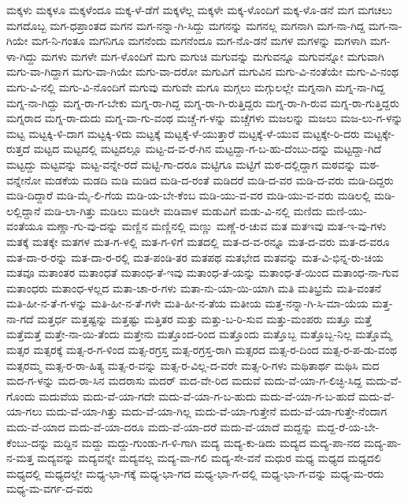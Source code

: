 {ಮಕ್ಕಳು
ಮಕ್ಕಳೂ
ಮಕ್ಕಳೆಂದೂ
ಮಕ್ಕ-ಳೆ-ಡೆಗೆ
ಮಕ್ಕಳೆಲ್ಲ
ಮಕ್ಕಳೇ
ಮಕ್ಕ-ಳೊಂದಿಗೆ
ಮಕ್ಕ-ಳೊ-ಡನೆ
ಮಗ
ಮಗಚಲು
ಮಗದೊಬ್ಬ
ಮಗ-ಧಪ್ರಾಂತದ
ಮಗನ
ಮಗ-ನನ್ನಾ-ಗಿ-ಸಿದ್ದು
ಮಗನನ್ನು
ಮಗನಲ್ಲ
ಮಗನಾಗಿ
ಮಗ-ನಾ-ಗಿದ್ದ
ಮಗ-ನಾ-ಗಿಯೇ
ಮಗ-ನಿ-ಗಂತೂ
ಮಗನಿಗೂ
ಮಗನೆಂದು
ಮಗನೆಂದೂ
ಮಗ-ನೊ-ಡನೆ
ಮಗಳ
ಮಗಳನ್ನು
ಮಗಳಾಗಿ
ಮಗ-ಳಾ-ಗಿದ್ದು
ಮಗಳು
ಮಗಳೇ
ಮಗ-ಳೊಂದಿಗೆ
ಮಗು
ಮಗುಚಿ
ಮಗುವನ್ನು
ಮಗುವನ್ನೂ
ಮಗುವನ್ನೋ
ಮಗುವಾಗಿ
ಮಗು-ವಾ-ಗಿದ್ದಾಗ
ಮಗು-ವಾ-ಗಿಯೇ
ಮಗು-ವಾ-ದರೋ
ಮಗುವಿಗೆ
ಮಗುವಿನ
ಮಗು-ವಿ-ನಂತೆಯೇ
ಮಗು-ವಿ-ನಂಥ
ಮಗು-ವಿ-ನಲ್ಲಿ
ಮಗು-ವಿ-ನೊಂದಿಗೆ
ಮಗುವು
ಮಗುವೇ
ಮಗೂ
ಮಗ್ಗಲು
ಮಗ್ಗುಲಲ್ಲೇ
ಮಗ್ನನಾಗಿ
ಮಗ್ನ-ನಾ-ಗಿದ್ದ
ಮಗ್ನ-ನಾ-ಗಿದ್ದು
ಮಗ್ನ-ರಾ-ಗ-ಬೇಕು
ಮಗ್ನ-ರಾ-ಗಿದ್ದ
ಮಗ್ನ-ರಾ-ಗಿ-ರುತ್ತಿದ್ದರು
ಮಗ್ನ-ರಾ-ಗಿ-ರುವ
ಮಗ್ನ-ರಾ-ಗುತ್ತಿದ್ದರು
ಮಗ್ನರಾದ
ಮಗ್ನ-ರಾ-ದುದು
ಮಗ್ನ-ವಾ-ಗು-ವಂಥ
ಮಚ್ಚೆ-ಗ-ಳನ್ನು
ಮಚ್ಚೆಗಳು
ಮಜಲನ್ನು
ಮಜಲು
ಮಜ-ಲು-ಗ-ಳನ್ನು
ಮಟ್ಟ
ಮಟ್ಟಕ್ಕಿ-ಳಿ-ದಾಗ
ಮಟ್ಟಕ್ಕಿ-ಳಿದು
ಮಟ್ಟಕ್ಕೆ
ಮಟ್ಟಕ್ಕೆ-ಳೆ-ಯುತ್ತಾರೆ
ಮಟ್ಟಕ್ಕೆ-ಳೆ-ಯುವ
ಮಟ್ಟಕ್ಕೇ-ರಿ-ದರು
ಮಟ್ಟಕ್ಕೇ-ರುತ್ತದೆ
ಮಟ್ಟದ
ಮಟ್ಟದಲ್ಲಿ
ಮಟ್ಟದಲ್ಲೂ
ಮಟ್ಟ-ದ-ವ-ರೆ-ಗಿನ
ಮಟ್ಟದ್ದಾ-ಗ-ಬ-ಹು-ದೆಂಬು-ದನ್ನು
ಮಟ್ಟದ್ದಾ-ಗಿದೆ
ಮಟ್ಟದ್ದು
ಮಟ್ಟವನ್ನು
ಮಟ್ಟ-ವನ್ನೇ-ರದೆ
ಮಟ್ಟಿ-ಗಾ-ದರೂ
ಮಟ್ಟಿಗೂ
ಮಟ್ಟಿಗೆ
ಮಠ-ದಲ್ಲಿದ್ದಾಗ
ಮಠವನ್ನು
ಮಠ-ವನ್ನೇನೋ
ಮಡಕೆಯ
ಮಡದಿ
ಮಡಿ
ಮಡಿದ
ಮಡಿ-ದ-ರಂತೆ
ಮಡಿದರೆ
ಮಡಿ-ದ-ವರ
ಮಡಿ-ದ-ವರು
ಮಡಿ-ದಿದ್ದರು
ಮಡಿ-ದಿದ್ದಾರೆ
ಮಡಿ-ಮೈ-ಲಿ-ಗೆಯ
ಮಡಿ-ಯ-ಬೇ-ಕೆಂಬ
ಮಡಿ-ಯು-ವ-ವರ
ಮಡಿ-ಯು-ವ-ವರು
ಮಡಿಲಲ್ಲಿ
ಮಡಿ-ಲಲ್ಲಿದ್ದಾನೆ
ಮಡಿ-ಲಾ-ಗಿತ್ತು
ಮಡಿಲು
ಮಡಿಲೇ
ಮಡಿವಾಳ
ಮಡುವಿಗೆ
ಮಡು-ವಿ-ನಲ್ಲಿ
ಮಣಿದು
ಮಣಿ-ಯು-ವಂತೆಯೂ
ಮಣ್ಣಾ-ಗು-ವು-ದನ್ನು
ಮಣ್ಣಿನ
ಮಣ್ಣಿನಲ್ಲಿ
ಮಣ್ಣು
ಮಣ್ಣೆ-ರ-ಚುವ
ಮತ
ಮತಇವು
ಮತ-ಇ-ವು-ಗಳು
ಮತಕ್ಕೆ
ಮತಕ್ಕೇ
ಮತಗಳ
ಮತ-ಗ-ಳಲ್ಲಿ
ಮತ-ಗ-ಳಿಗೆ
ಮತದಲ್ಲಿ
ಮತ-ದ-ವ-ರನ್ನೂ
ಮತ-ದ-ವರು
ಮತ-ದ-ವರೂ
ಮತ-ದಾ-ರ-ರನ್ನು
ಮತ-ದಾ-ರ-ರಲ್ಲಿ
ಮತ-ಪಂಡಿ-ತರ
ಮತಪಥ
ಮತಭೇದ
ಮತವನ್ನು
ಮತ-ವಿ-ಭಿನ್ನ-ರು-ಚಿಯ
ಮತವೂ
ಮತಾಂತರ
ಮತಾಂಧತೆ
ಮತಾಂಧ-ತೆ-ಇವು
ಮತಾಂಧ-ತೆ-ಯನ್ನು
ಮತಾಂಧ-ತೆ-ಯಿಂದ
ಮತಾಂಧ-ನಾ-ಗುವ
ಮತಾಂಧರು
ಮತಾಂಧ-ಳಲ್ಲದ
ಮತಾ-ಚಾ-ರ-ಗಳು
ಮತಾ-ನು-ಯಾ-ಯಿ-ಯಾಗಿ
ಮತಿ
ಮತಿಭ್ರಮೆ
ಮತಿ-ವಂತನೆ
ಮತಿ-ಹೀ-ನ-ತೆ-ಗ-ಳನ್ನು
ಮತಿ-ಹೀ-ನ-ತೆ-ಗಳೇ
ಮತಿ-ಹೀ-ನ-ತೆಯ
ಮತೀಯ
ಮತ್ತ-ನನ್ನಾ-ಗಿ-ಸಿ-ಮಾ-ಯೆಯ
ಮತ್ತ-ನಾ-ಗದೆ
ಮತ್ತರ್ಧ
ಮತ್ತಷ್ಟನ್ನು
ಮತ್ತಷ್ಟು
ಮತ್ತಿತರ
ಮತ್ತು
ಮತ್ತು-ಬ-ರಿ-ಸುವ
ಮತ್ತು-ಮಂಪರು
ಮತ್ತೂ
ಮತ್ತೆ
ಮತ್ತೆಮತ್ತೆ
ಮತ್ತೇ-ನಾ-ಯಿ-ತೆಂದು
ಮತ್ತೇನು
ಮತ್ತೊಂದ-ರಿಂದ
ಮತ್ತೊಂದು
ಮತ್ತೊಬ್ಬ
ಮತ್ತೊಬ್ಬ-ನಿಲ್ಲ
ಮತ್ತೊಮ್ಮೆ
ಮತ್ಸರ
ಮತ್ಸರಕ್ಕೆ
ಮತ್ಸ-ರ-ಗ-ಳಿಂದ
ಮತ್ಸ-ರಗ್ರಸ್ತ
ಮತ್ಸ-ರಗ್ರಸ್ತ-ರಾಗಿ
ಮತ್ಸರದ
ಮತ್ಸ-ರ-ದಿಂದ
ಮತ್ಸ-ರ-ಪ-ಡು-ವಂಥ
ಮತ್ಸರಮ್ಮ
ಮತ್ಸ-ರ-ರಾ-ಹಿತ್ಯ
ಮತ್ಸ-ರ-ವನ್ನು
ಮತ್ಸ-ರ-ವಿಲ್ಲ-ದ-ವರೇ
ಮತ್ಸ-ರಿ-ಗಳು
ಮಥಿತಾರ್ಥ
ಮಥಿಸಿ
ಮದ
ಮದ-ಗ-ಳನ್ನು
ಮದ-ರಾ-ಸಿನ
ಮದರಾಸು
ಮದರ್
ಮದ-ವೇ-ರಿದ
ಮದುವೆ
ಮದು-ವೆ-ಯಾ-ಗ-ಲಿಚ್ಛಿ-ಸಿದ್ದ
ಮದು-ವೆ-ಗೊಂದು
ಮದುವೆಯ
ಮದು-ವೆ-ಯಾ-ಗದೇ
ಮದು-ವೆ-ಯಾ-ಗ-ಬ-ಹುದು
ಮದು-ವೆ-ಯಾ-ಗ-ಬ-ಹುದೆ
ಮದು-ವೆ-ಯಾ-ಗಲು
ಮದು-ವೆ-ಯಾ-ಗಿತ್ತು
ಮದು-ವೆ-ಯಾ-ಗಿಲ್ಲ
ಮದು-ವೆ-ಯಾ-ಗುತ್ತೇನೆ
ಮದು-ವೆ-ಯಾ-ಗುತ್ತೇ-ನೆಂದಾಗ
ಮದು-ವೆ-ಯಾದ
ಮದು-ವೆ-ಯಾ-ದರೂ
ಮದು-ವೆ-ಯಾ-ದರೆ
ಮದು-ವೆ-ಯಾದೆ
ಮದ್ದನ್ನು
ಮದ್ದ-ರೆ-ಯ-ಬೇ-ಕೆಂಬು-ದನ್ನು
ಮದ್ದಿನ
ಮದ್ದು
ಮದ್ದು-ಗುಂಡು-ಗ-ಳಿ-ಗಾಗಿ
ಮದ್ಯ
ಮದ್ಯ-ಕು-ಡಿದು
ಮದ್ಯದ
ಮದ್ಯ-ಪಾ-ನದ
ಮದ್ಯ-ಪಾ-ನ-ಮತ್ತ
ಮದ್ಯವನ್ನು
ಮದ್ಯವನ್ನೇ
ಮದ್ಯವಲ್ಲ
ಮದ್ಯ-ವಾ-ಗಲಿ
ಮದ್ಯ-ಸೇ-ವನೆ
ಮಧುರ
ಮಧ್ಯ
ಮಧ್ಯದ
ಮಧ್ಯದಲಿ
ಮಧ್ಯದಲ್ಲಿ
ಮಧ್ಯದಲ್ಲೇ
ಮಧ್ಯ-ಭಾ-ಗಕ್ಕೆ
ಮಧ್ಯ-ಭಾ-ಗದ
ಮಧ್ಯ-ಭಾ-ಗ-ದಲ್ಲಿ
ಮಧ್ಯ-ಭಾ-ಗ-ವನ್ನು
ಮಧ್ಯ-ಮ-ರದು
ಮಧ್ಯ-ಮ-ವರ್ಗ-ದ-ವರು
}
